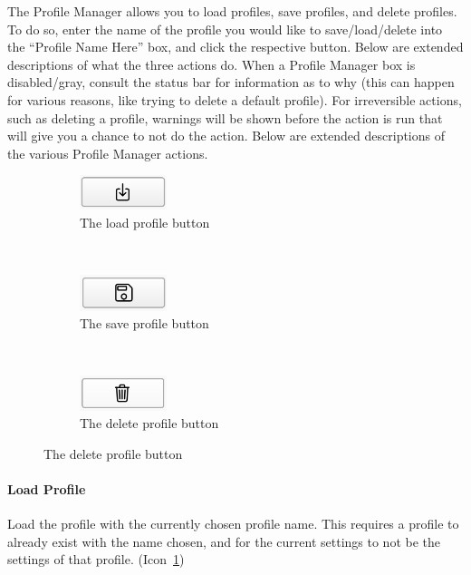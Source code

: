 \documentclass[titlepage]{article}
\begin{document}
The Profile Manager allows you to load profiles, save profiles, and delete profiles. To do so, enter the name of the profile you would like to save/load/delete into the ``Profile Name Here'' box, and click the respective button. Below are extended descriptions of what the three actions do. When a Profile Manager box is disabled/gray, consult the status bar for information as to why (this can happen for various reasons, like trying to delete a default profile). For irreversible actions, such as deleting a profile, warnings will be shown before the action is run that will give you a chance to not do the action. Below are extended descriptions of the various Profile Manager actions.

\begin{figure}
	\caption{Various Profile Actions}
	
	\centering
	\begin{subfigure}{.3\textwidth} \label{fig:load-profile-button}
		\centering
		\caption{The load profile button}
		\includegraphics[width=1in]{load-profile-button.png}
	\end{subfigure}%
	~
	\begin{subfigure}{.3\textwidth} \label{fig:save-profile-button}
		\centering
		\caption{The save profile button}
		\includegraphics[width=1in]{save-profile-button.png}
	\end{subfigure}%
	~
	\begin{subfigure}{.3\textwidth} \label{fig:delete-profile-button}
		\centering
		\caption{The delete profile button}
		\includegraphics[width=1in]{delete-profile-button.png}
	\end{subfigure}
\end{figure}

\paragraph{Load Profile}
Load the profile with the currently chosen profile name. This requires a profile to already exist with the name chosen, and for the current settings to not be the settings of that profile. (Icon~\ref{fig:load-profile-button})
\end{document}
